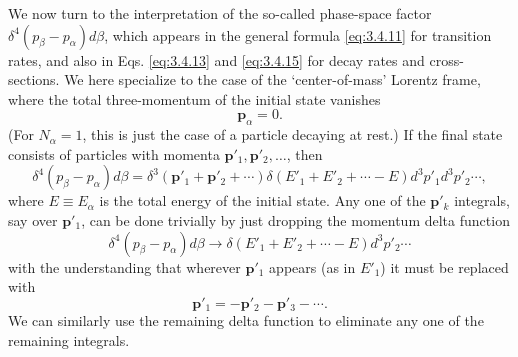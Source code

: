 We now turn to the interpretation of the so-called phase-space factor
$\delta^4(p_\beta-p_\alpha)d\beta$, which appears in the general formula \eqref{eq:3.4.11} for transition
rates, and also in Eqs. \eqref{eq:3.4.13} and \eqref{eq:3.4.15} for decay rates and cross-sections. We here
specialize to the case of the `center-of-mass' Lorentz frame, where the total three-momentum
of the initial state vanishes
\begin{equation}
 \mathbf{p}_\alpha=0.
 \tag{3.4.19}\label{eq:3.4.19}
\end{equation}
(For $N_\alpha=1$, this is just the case of a particle decaying at rest.) If the final state
consists of particles with momenta $\mathbf{p}'_1,\mathbf{p}'_2,\ldots$, then
\begin{equation}
 \delta^4(p_\beta-p_\alpha)d\beta
 =\delta^3(\mathbf{p}'_1+\mathbf{p}'_2+\cdots)
 \delta(E'_1+E'_2+\cdots-E)d^3p'_1d^3p'_2\cdots,
 \tag{3.4.20}\label{eq:3.4.20}
\end{equation}
where $E\equiv E_\alpha$ is the total energy of the initial state. Any one of the
$\mathbf{p}'_k$ integrals, say over $\mathbf{p}'_1$, can be done trivially by just dropping the
momentum delta function
\begin{equation}
 \delta^4(p_\beta-p_\alpha)d\beta\longrightarrow
 \delta(E'_1+E'_2+\cdots-E)d^3p'_2\cdots
 \tag{3.4.21}\label{eq:3.4.21}
\end{equation}
with the understanding that wherever $\mathbf{p}'_1$ appears (as in $E'_1$) it must be replaced
with
\begin{equation}
 \mathbf{p}'_1=-\mathbf{p}'_2-\mathbf{p}'_3-\cdots.
 \tag{3.4.22}\label{eq:3.4.22}
\end{equation}
We can similarly use the remaining delta function to eliminate any one of the remaining integrals.

